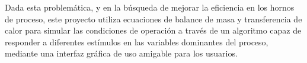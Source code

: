 \par Dada esta problemática, y en la búsqueda de mejorar la eficiencia en los hornos de proceso, este proyecto utiliza ecuaciones de balance de masa y transferencia de calor para simular las condiciones de operación a través de un algoritmo capaz de responder a diferentes estímulos en las variables dominantes del proceso, mediante una interfaz gráfica de uso amigable para los usuarios.